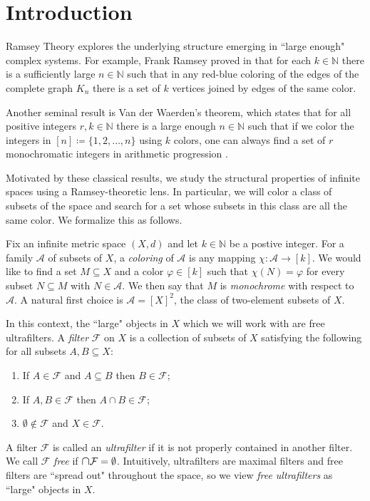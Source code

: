 \section{Introduction}
Ramsey Theory explores the underlying structure emerging in ``large enough" complex systems. For example, Frank Ramsey proved in \cite{ramsey:1930} that for each \( k \in \mathbb{N}  \) there is a sufficiently large \( n \in \mathbb{N}  \) such that in any red-blue coloring of the edges of the complete graph \( K_{n} \) there is a set of \( k \) vertices joined by edges of the same color.

Another seminal result is Van der Waerden's theorem, which states that for all positive integers \( r, k \in \mathbb{N}  \) there is a large enough \( n \in \mathbb{N}  \) such that if we color the integers in \( [n] \coloneqq \{ 1,2,\hdots ,n \}  \) using \( k \) colors, one can always find a set of \( r \) monochromatic integers in arithmetic progression \cite{waerden:1927}.

Motivated by these classical results, we study the structural properties of infinite spaces using a Ramsey-theoretic lens. In particular, we will color a class of subsets of the space and search for a set whose subsets in this class are all the same color. We formalize this as follows.

Fix an infinite metric space \( (X,d) \) and let \( k \in \mathbb{N}  \) be a postive integer. For a family \( \mathcal{A} \) of subsets of \( X \), a \emph{coloring} of \( \mathcal{A}  \) is any mapping \( \chi : \mathcal{A} \to [k] \). We would like to find a set \( M \subseteq X \) and a color \( \varphi  \in [k] \) such that \( \chi(N) = \varphi  \) for every subset \( N \subseteq M \) with \(N \in \mathcal{A}  \). We then say that \( M \) is \emph{monochrome} with respect to \( \mathcal{A}  \). A natural first choice is \( \mathcal{A} = [X]^{2}  \), the class of two-element subsets of \( X \).

In this context, the ``large" objects in \( X \) which we will work with are free ultrafilters. A \emph{filter} \( \mathcal{F}  \) on \( X \) is a collection of subsets of \( X \) satisfying the following for all subsets \( A, B \subseteq X \):
\begin{enumerate}[leftmargin=1.2cm]
	
	\item If \( A \in \mathcal{F} \) and \( A \subseteq B \) then \( B \in \mathcal{F}  \);
	\item If \( A, B \in \mathcal{F}  \) then \( A \cap B \in \mathcal{F}  \);
	\item \( \emptyset  \notin \mathcal{F}  \) and \( X \in \mathcal{F}  \).
\end{enumerate}
A filter \( \mathcal{F}  \) is called an \emph{ultrafilter} if it is not properly contained in another filter. We call \( \mathcal{F}  \) \emph{free} if \( \medcap \mathcal{F} = \emptyset  \). Intuitively, ultrafilters are maximal filters and free filters are ``spread out" throughout the space, so we view \emph{free ultrafilters} as ``large" objects in \( X \).


